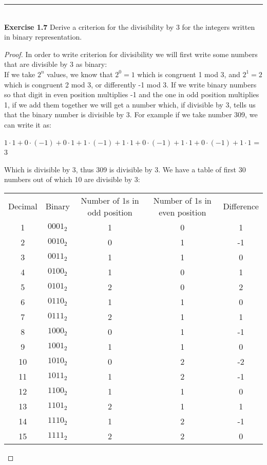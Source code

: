 \documentclass{article}
\begin{document}
\noindent\rule{12cm}{0.4pt}\\
\noindent \textbf{Exercise 1.7} Derive a criterion for the divisibility by 3 for the integers written in binary representation.
\begin{proof}
In order to write criterion for divisibility we will first write some numbers that are divisible by 3 as binary:\\
If we take $2^n$ values, we know that $2^0 = 1$ which is congruent 1 mod 3, and $2^1 = 2$ which is congruent 2 mod 3, or differently -1 mod 3. If we write binary numbers so that digit in even position multiplies -1 and the one in odd position multiplies 1, if we add them together we will get a number which, if divisible by 3, tells us that the binary number is divisible by 3. For example if we take number 309, we can write it as:\\
\begin{center}
$1 \cdot 1 + 0 \cdot (-1) + 0 \cdot 1 + 1 \cdot (-1) + 1 \cdot 1 + 0 \cdot (-1) + 1  \cdot 1 + 0 \cdot (-1) + 1 \cdot 1$ = 3
\end{center} 
Which is divisible by 3, thus 309 is divisible by 3. We have a table of first 30 numbers out of which 10 are divisible by 3: \\
\begin{center}
\begin{tabular}{ c c c c c  }
Decimal & Binary & Number of 1s in odd position & Number of 1s in even position & Difference \\
 1 & $0001_2$ & 1 & 0 & 1 \\ 
 2 & $0010_2$ & 0 & 1 & -1 \\ 
 3 & $0011_2$ & 1 & 1 & 0 \\   
 4 & $0100_2$ & 1 & 0 & 1 \\ 
 5 & $0101_2$ & 2 & 0 & 2 \\ 
 6 & $0110_2$ & 1 & 1 & 0 \\ 
 7 & $0111_2$ & 2 & 1 & 1 \\ 
 8 & $1000_2$ & 0 & 1 & -1 \\ 
 9 & $1001_2$ & 1 & 1 & 0 \\ 
 10 & $1010_2$ & 0 & 2 & -2 \\ 
 11 & $1011_2$ & 1 & 2 & -1 \\ 
 12 & $1100_2$ & 1 & 1 & 0 \\ 
 13 & $1101_2$ & 2 & 1 & 1 \\ 
 14 & $1110_2$ & 1 & 2 & -1 \\ 
 15 & $1111_2$ & 2 & 2 & 0 \\ 

\end{tabular}
\end{center}
\end{proof}
\end{document}
